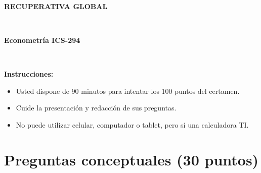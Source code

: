 \documentclass[10pt,a4paper]{article}
\begin{document}
\vspace{5cm}



\begin{center}
\begin{large}
\textbf{\\RECUPERATIVA GLOBAL }
\end{large}\\
\end{center}

\begin{center}
\begin{large}
\textbf{Econometría ICS-294}
\end{large}\\

\end{center}

\textbf{Instrucciones:} 

\begin{itemize}

    \item Usted dispone de 90 minutos  para intentar los 100 puntos del certamen.
    \item Cuide la presentación y redacción de sus preguntas.
    \item No puede utilizar celular, computador o tablet, pero sí una calculadora TI.
     
\end{itemize}

\section{Preguntas conceptuales (30 puntos)}
\end{document}
